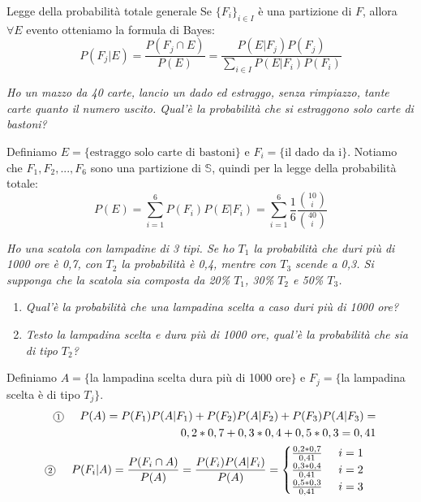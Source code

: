 \begin{Osservation}{Legge della probabilità totale generale}{}
    Se $\{F_i\}_{i\in I}$ è una partizione di $F$, allora $\forall E$ evento otteniamo la formula di Bayes:
    \begin{equation*}
        P(F_j|E)=\frac{P(F_j\cap E)}{P(E)}=\frac{P(E|F_j)P(F_j)}{\sum_{i\in I}P(E|F_i)P(F_i)}
    \end{equation*}
\end{Osservation}

\begin{Example}{}{}
    \textit{Ho un mazzo da 40 carte, lancio un dado ed estraggo, senza rimpiazzo, tante carte quanto il numero uscito. Qual'è la probabilità che si estraggono solo carte di bastoni?}

    Definiamo $E=\{\mbox{estraggo solo carte di bastoni}\}$ e $F_i=\{\mbox{il dado da i}\}$. Notiamo che $F_1,F_2,...,F_6$ sono una partizione di $\mathbb{S}$, quindi per la legge della probabilità totale:
    \begin{equation*}
        P(E)=\sum_{i=1}^6P(F_i)P(E|F_i)=\sum_{i=1}^6\frac{1}{6}\frac{\binom{10}{i}}{\binom{40}{i}}
    \end{equation*}
\end{Example}

\begin{Example}{}{}
   \textit{ Ho una scatola con lampadine di 3 tipi. Se ho $T_1$ la probabilità che duri più di 1000 ore è 0,7, con $T_2$ la probabilità è 0,4, mentre con $T_3$ scende a 0,3. Si supponga che la scatola sia composta da 20\% $T_1$, 30\% $T_2$ e 50\% $T_3$.}
    \begin{enumerate}
        \item \textit{Qual'è la probabilità che una lampadina scelta a caso duri più di 1000 ore?}
        \item \textit{Testo la lampadina scelta e dura più di 1000 ore, qual'è la probabilità che sia di tipo $T_2$?}
    \end{enumerate}

    Definiamo $A=\{$la lampadina scelta dura più di 1000 ore$\}$ e $F_j=\{$la lampadina scelta è di tipo $T_j\}$.
    \begin{align*}
        \circled{1}\hspace{0.5cm}P(A)=P(F_1)P(A|F_1)+P(F_2)P(A|F_2)+P(F_3)P(A|F_3)=\\0,2*0,7+0,3*0,4+0,5*0,3=0,41\\
        \circled{2}\hspace{0.5cm}P(F_i|A)=\frac{P(F_i\cap A)}{P(A)}=\frac{P(F_i)P(A|F_i)}{P(A)}=\begin{cases}
            \frac{0,2*0,7}{0,41}\hspace{0.5cm}i=1\\
            \frac{0,3*0,4}{0,41}\hspace{0.5cm}i=2\\
            \frac{0,5*0,3}{0,41}\hspace{0.5cm}i=3
        \end{cases}
    \end{align*}
\end{Example}

